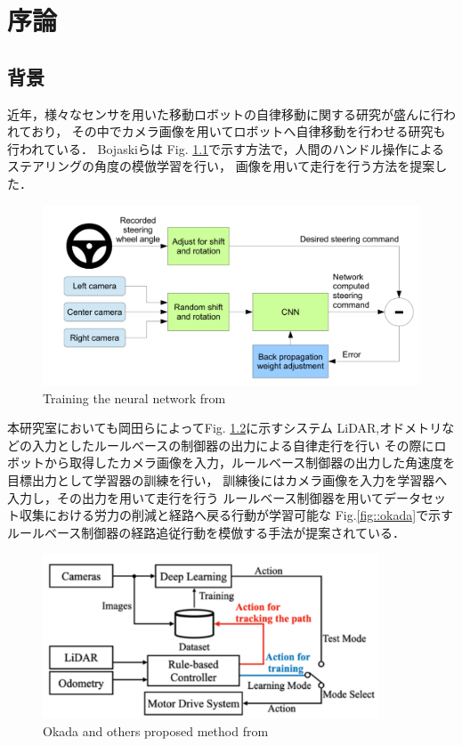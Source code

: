 \chapter{序論}
\section{背景}
近年，様々なセンサを用いた移動ロボットの自律移動に関する研究が盛んに行われており，
その中でカメラ画像を用いてロボットへ自律移動を行わせる研究も行われている．
Bojaskiら\cite{Nvidia}は
Fig. \ref{fig::nvidia}で示す方法で，人間のハンドル操作によるステアリングの角度の模倣学習を行い，
画像を用いて走行を行う方法を提案した．

\begin{figure}[h]
    \centering
    \includegraphics[width = 13cm]{./figs/EndtoEnd_Learning_for_Self-Driving_Cars.pdf}
    \caption{Training the neural network from \cite{Nvidia}}
    \label{fig::nvidia}
\end{figure}

\newpage
本研究室においても岡田ら\cite{okada}によってFig. \ref{fig::okada_sys}に示すシステム
LiDAR,オドメトリなどの入力としたルールべースの制御器の出力による自律走行を行い
その際にロボットから取得したカメラ画像を入力，ルールベース制御器の出力した角速度を目標出力として学習器の訓練を行い，
訓練後にはカメラ画像を入力を学習器へ入力し，その出力を用いて走行を行う
ルールベース制御器を用いてデータセット収集における労力の削減と経路へ戻る行動が学習可能な
Fig.\ref{fig::okada}で示すルールベース制御器の経路追従行動を模倣する手法が提案されている．
\begin{figure}[h]
    \centering
    \includegraphics[width = 10cm]{./figs/okada_sys.png}
    \caption{Okada and others proposed method from \cite{okada}}
    \label{fig::okada_sys}
\end{figure}

